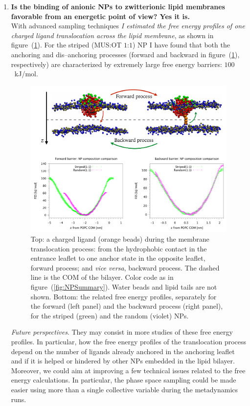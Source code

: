 
\begin{enumerate}[label=\itshape\roman*.,listparindent=1em]
	\item \textbf{\textsf{Is the binding of anionic \acp{NP} to zwitterionic lipid membranes favorable from an energetic point of view? Yes it is.}}\\With advanced sampling techniques \textit{I estimated the free energy profiles of one charged ligand translocation across the lipid membrane}, as shown in figure~(\ref{fig:coglionazzo}). For the striped (\acs{MUS}:\acs{OT} $1$:$1$) \ac{NP} I have found that both the anchoring and dis--anchoring processes (forward and backward in figure~(\ref{fig:coglionazzo}), respectively) are characterized by extremely large free energy barriers: $100$~kJ/mol.%
\begin{figure}[ht]
	\center
	\includegraphics[width=1\textwidth]{./img/coglionazzo}
	\caption{Top: a charged ligand (orange beads) during the membrane translocation process: from the hydrophobic contact in the entrance leaflet to one anchor state in the opposite leaflet, forward process; and \textit{vice versa}, backward process. The dashed line is the \acs{COM} of the bilayer. Color code as in figure~(\ref{fig:NPSummary}). Water beads and lipid tails are not shown. Bottom: the related free energy profiles, separately for the forward (left panel) and the backward process (right panel), for the striped (green) and the random (violet) \acp{NP}.}%
	\label{fig:coglionazzo}
\end{figure}%
\newpage
	\indent\textit{Future perspectives}. They may consist in more studies of these free energy profiles. In particular, how the free energy profiles of the translocation process depend on the number of ligands already anchored in the anchoring leaflet and if it is helped or hindered by other \acp{NP} embedded in the lipid bilayer. Moreover, we could aim at improving a few technical issues related to the free energy calculations. In particular, the phase space sampling could be made easier using more than a single collective variable during the metadynamics runs.%


\end{enumerate}
